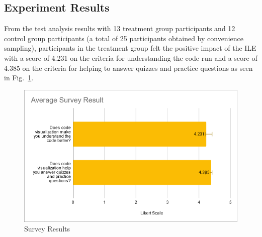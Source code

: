 \documentclass[conference]{IEEEtran}
\begin{document}
\subsection{Experiment Results}
From the test analysis results with 13 treatment group participants and 12 control group participants (a total of 25 participants obtained by convenience sampling), participants in the treatment group felt the positive impact of the ILE with a score of 4.231 on the criteria for understanding the code run and a score of 4.385 on the criteria for helping to answer quizzes and practice questions as seen in Fig.~\ref{fig:kuesioner-average-paper}.
\begin{figure}[htbp]
  \centerline{\includegraphics[width=0.6\linewidth]{chapter4/kuesioner-average-paper.png}}
  \caption{Survey Results} \label{fig:kuesioner-average-paper}
\end{figure}
\end{document}
